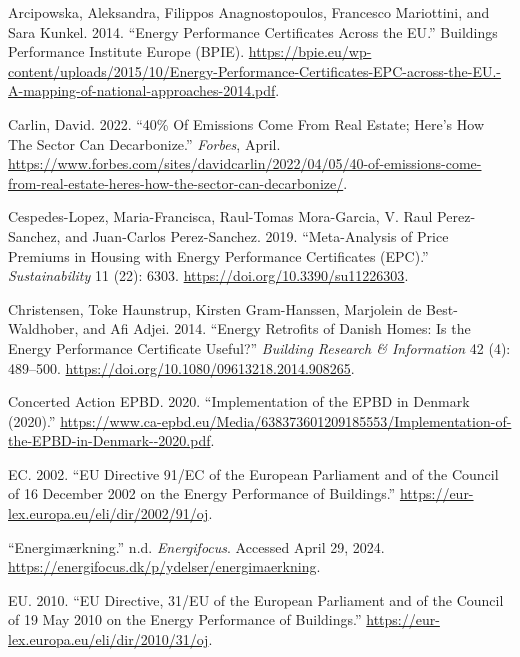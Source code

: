 \documentclass[
  letterpaper,
  DIV=11,
  numbers=noendperiod]{scrreprt}
\newlength{\cslhangindent}
\newenvironment{CSLReferences}[2] %
 {\begin{list}{}{%
  \setlength{\itemindent}{0pt}
  \setlength{\leftmargin}{0pt}
  \setlength{\parsep}{0pt}
  \ifodd #1
   \setlength{\leftmargin}{\cslhangindent}
   \setlength{\itemindent}{-1\cslhangindent}
  \fi
  \setlength{\itemsep}{#2\baselineskip}}}
 {\end{list}}
\begin{document}
\label{refs}
\begin{CSLReferences}{1}{0}
Arcipowska, Aleksandra, Filippos Anagnostopoulos, Francesco Mariottini,
and Sara Kunkel. 2014. {``Energy Performance Certificates Across the
{EU}.''} Buildings Performance Institute Europe (BPIE).
\url{https://bpie.eu/wp-content/uploads/2015/10/Energy-Performance-Certificates-EPC-across-the-EU.-A-mapping-of-national-approaches-2014.pdf}.

Carlin, David. 2022. {``40\% {Of} {Emissions} {Come} {From} {Real}
{Estate}; {Here}'s {How} {The} {Sector} {Can} {Decarbonize}.''}
\emph{Forbes}, April.
\url{https://www.forbes.com/sites/davidcarlin/2022/04/05/40-of-emissions-come-from-real-estate-heres-how-the-sector-can-decarbonize/}.

Cespedes-Lopez, Maria-Francisca, Raul-Tomas Mora-Garcia, V. Raul
Perez-Sanchez, and Juan-Carlos Perez-Sanchez. 2019. {``Meta-{Analysis}
of {Price} {Premiums} in {Housing} with {Energy} {Performance}
{Certificates} ({EPC}).''} \emph{Sustainability} 11 (22): 6303.
\url{https://doi.org/10.3390/su11226303}.

Christensen, Toke Haunstrup, Kirsten Gram-Hanssen, Marjolein de
Best-Waldhober, and Afi Adjei. 2014. {``Energy Retrofits of {Danish}
Homes: Is the {Energy} {Performance} {Certificate} Useful?''}
\emph{Building Research \& Information} 42 (4): 489--500.
\url{https://doi.org/10.1080/09613218.2014.908265}.

Concerted Action EPBD. 2020. {``Implementation of the {EPBD} in
{Denmark} (2020).''}
\url{https://www.ca-epbd.eu/Media/638373601209185553/Implementation-of-the-EPBD-in-Denmark--2020.pdf}.

EC. 2002. {``{EU} {Directive} 91/{EC} of the {European} {Parliament} and
of the {Council} of 16 {December} 2002 on the {Energy} {Performance} of
{Buildings}.''} \url{https://eur-lex.europa.eu/eli/dir/2002/91/oj}.

{``Energimærkning.''} n.d. \emph{Energifocus}. Accessed April 29, 2024.
\url{https://energifocus.dk/p/ydelser/energimaerkning}.

EU. 2010. {``{EU} {Directive}, 31/{EU} of the {European} {Parliament}
and of the {Council} of 19 {May} 2010 on the {Energy} {Performance} of
{Buildings}.''} \url{https://eur-lex.europa.eu/eli/dir/2010/31/oj}.


\end{CSLReferences}
\end{document}
